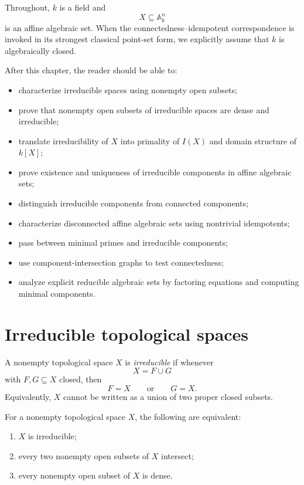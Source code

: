 Throughout, \(k\) is a field and
\[
X\subseteq \mathbb A_k^n
\]
is an affine algebraic set.  When the connectedness--idempotent correspondence is invoked
in its strongest classical point-set form, we explicitly assume that \(k\) is algebraically
closed.

After this chapter, the reader should be able to:
\begin{itemize}
  \item characterize irreducible spaces using nonempty open subsets;
  \item prove that nonempty open subsets of irreducible spaces are dense and irreducible;
  \item translate irreducibility of \(X\) into primality of \(I(X)\) and domain structure
        of \(k[X]\);
  \item prove existence and uniqueness of irreducible components in affine algebraic sets;
  \item distinguish irreducible components from connected components;
  \item characterize disconnected affine algebraic sets using nontrivial idempotents;
  \item pass between minimal primes and irreducible components;
  \item use component-intersection graphs to test connectedness;
  \item analyze explicit reducible algebraic sets by factoring equations and computing
        minimal components.
\end{itemize}

\section{Irreducible topological spaces}

\begin{definition}
A nonempty topological space \(X\) is \emph{irreducible} if whenever
\[
X=F\cup G
\]
with \(F,G\subseteq X\) closed, then
\[
F=X
\qquad\text{or}\qquad
G=X.
\]
Equivalently, \(X\) cannot be written as a union of two proper closed subsets.
\end{definition}

\begin{proposition}
\label{prop:vi05-open-criterion}
For a nonempty topological space \(X\), the following are equivalent:
\begin{enumerate}
  \item \(X\) is irreducible;
  \item every two nonempty open subsets of \(X\) intersect;
  \item every nonempty open subset of \(X\) is dense.
\end{enumerate}
\end{proposition}

